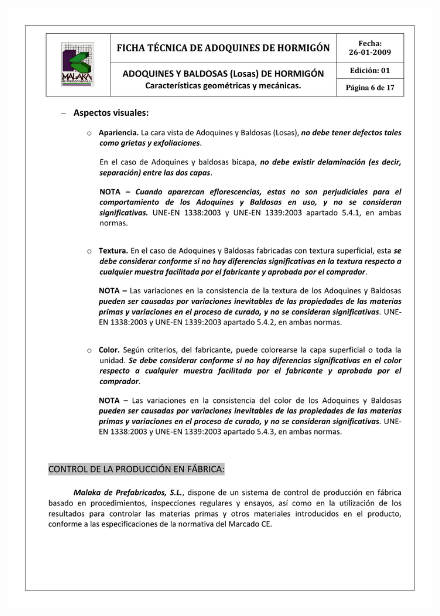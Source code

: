 \begin{figure}[!htb]
\centering
\includegraphics[scale=0.68]{ficha_tecnica/ft_adoquin_6.pdf}
\label{fig:ftadoquin6}
\end{figure}
